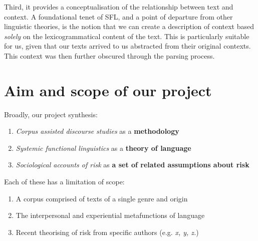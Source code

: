      Third, it provides a conceptualisation of the relationship between text and context. A foundational tenet of SFL, and a point of departure from other linguistic theories, is the notion that we can create a description of context based \emph{solely} on the lexicogrammatical content of the text. This is particularly suitable for us, given that our texts arrived to us abstracted from their original contexts. This context was then further obscured through the parsing process.


\section{Aim and scope of our project}

Broadly, our project synthesis:

\begin{enumerate}
    \item \emph{Corpus assisted discourse studies} as a \textbf{methodology}
    \item \emph{Systemic functional linguistics} as a \textbf{theory of language}
    \item \emph{Sociological accounts of risk} as \textbf{a set of related assumptions about risk}
\end{enumerate}

Each of these has a limitation of scope:

\begin{enumerate}
    \item A corpus comprised of texts of a single genre and origin
    \item The interpersonal and experiential metafunctions of language
    \item Recent theorising of risk from specific authors (e.g. \emph{x, y, z.})
\end{enumerate}

%